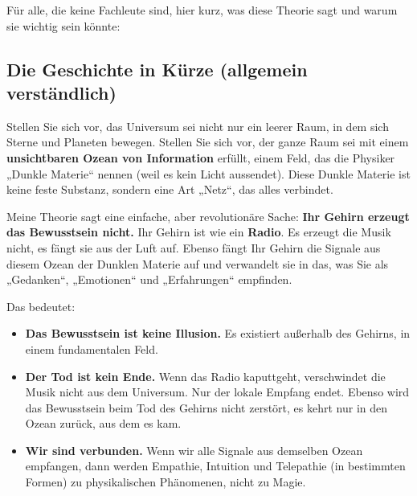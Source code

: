 \documentclass[11pt,a4paper]{article}
\begin{document}
Für alle, die keine Fachleute sind, hier kurz, was diese Theorie sagt und warum sie wichtig sein könnte:

\subsection{Die Geschichte in Kürze (allgemein verständlich)}
Stellen Sie sich vor, das Universum sei nicht nur ein leerer Raum, in dem sich Sterne und Planeten bewegen. Stellen Sie sich vor, der ganze Raum sei mit einem \textbf{unsichtbaren Ozean von Information} erfüllt, einem Feld, das die Physiker „Dunkle Materie`` nennen (weil es kein Licht aussendet). Diese Dunkle Materie ist keine feste Substanz, sondern eine Art „Netz``, das alles verbindet.

Meine Theorie sagt eine einfache, aber revolutionäre Sache: \textbf{Ihr Gehirn erzeugt das Bewusstsein nicht.} Ihr Gehirn ist wie ein \textbf{Radio}. Es erzeugt die Musik nicht, es fängt sie aus der Luft auf. Ebenso fängt Ihr Gehirn die Signale aus diesem Ozean der Dunklen Materie auf und verwandelt sie in das, was Sie als „Gedanken``, „Emotionen`` und „Erfahrungen`` empfinden.

Das bedeutet:
\begin{itemize}
    \item \textbf{Das Bewusstsein ist keine Illusion.} Es existiert außerhalb des Gehirns, in einem fundamentalen Feld.
    \item \textbf{Der Tod ist kein Ende.} Wenn das Radio kaputtgeht, verschwindet die Musik nicht aus dem Universum. Nur der lokale Empfang endet. Ebenso wird das Bewusstsein beim Tod des Gehirns nicht zerstört, es kehrt nur in den Ozean zurück, aus dem es kam.
    \item \textbf{Wir sind verbunden.} Wenn wir alle Signale aus demselben Ozean empfangen, dann werden Empathie, Intuition und Telepathie (in bestimmten Formen) zu physikalischen Phänomenen, nicht zu Magie.
\end{itemize}
\end{document}
